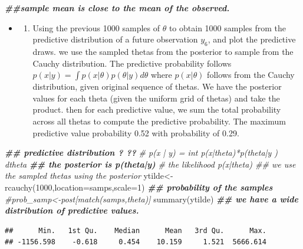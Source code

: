 \documentclass[
]{book}
\newenvironment{Shaded}{\begin{snugshade}}{\end{snugshade}}
\newcommand{\AttributeTok}[1]{\textcolor[rgb]{0.77,0.63,0.00}{#1}}
\newcommand{\CommentTok}[1]{\textcolor[rgb]{0.56,0.35,0.01}{\textit{#1}}}
\newcommand{\DecValTok}[1]{\textcolor[rgb]{0.00,0.00,0.81}{#1}}
\newcommand{\DocumentationTok}[1]{\textcolor[rgb]{0.56,0.35,0.01}{\textbf{\textit{#1}}}}
\newcommand{\FunctionTok}[1]{\textcolor[rgb]{0.00,0.00,0.00}{#1}}
\newcommand{\NormalTok}[1]{#1}
\newcommand{\OtherTok}[1]{\textcolor[rgb]{0.56,0.35,0.01}{#1}}
\providecommand{\tightlist}{%
  \setlength{\itemsep}{0pt}\setlength{\parskip}{0pt}}
\theoremstyle{definition}
\theoremstyle{definition}
\theoremstyle{definition}
\theoremstyle{definition}
\theoremstyle{remark}
\begin{document}
\begin{Shaded}
\begin{Highlighting}[]
  \DocumentationTok{\#\#sample mean is close to the mean of the observed.}
\end{Highlighting}
\end{Shaded}

\begin{itemize}
\item
  \begin{enumerate}
  \def\labelenumi{(\alph{enumi})}
  \setcounter{enumi}{2}
  \tightlist
  \item
    Using the previous 1000 samples of \(\theta\) to obtain 1000 samples from the predictive distribution of a future observation \(y_6\), and plot the predictive draws.
    we use the sampled thetas from the posterior to sample from the Cauchy distribution. The predictive probability follows \(p(x|y) =\int p(x|\theta)p(\theta|y)d\theta\) where \(p(x|\theta)\) follows from the Cauchy distribution, given original sequence of thetas. We have the posterior values for each theta (given the uniform grid of thetas) and take the product. then for each predictive value, we sum the total probability across all thetas to compute the predictive probability. The maximum predictive value probability 0.52 with probability of 0.29.
  \end{enumerate}
\end{itemize}

\begin{Shaded}
\begin{Highlighting}[]
\DocumentationTok{\#\# predictive distribution ? ?? }
 \CommentTok{\# p(x | y) = int p(x|theta)*p(theta|y ) dtheta}
\DocumentationTok{\#\# the posterior is p(theta|y) }
 \CommentTok{\# the likelihood p(x|theta)  \#\# we use the sampled thetas using the posterior}
\NormalTok{ ytilde}\OtherTok{\textless{}{-}}\FunctionTok{rcauchy}\NormalTok{(}\DecValTok{1000}\NormalTok{,}\AttributeTok{location=}\NormalTok{samps,}\AttributeTok{scale=}\DecValTok{1}\NormalTok{) }
 \DocumentationTok{\#\# probability of the samples }
 \CommentTok{\#prob\_samp\textless{}{-}post[match(samps,theta)]}
  \FunctionTok{summary}\NormalTok{(ytilde) }\DocumentationTok{\#\# we have a wide distribution of predictive values.}
\end{Highlighting}
\end{Shaded}

\begin{verbatim}
##      Min.   1st Qu.    Median      Mean   3rd Qu.      Max. 
## -1156.598    -0.618     0.454    10.159     1.521  5666.614
\end{verbatim}
\end{document}
